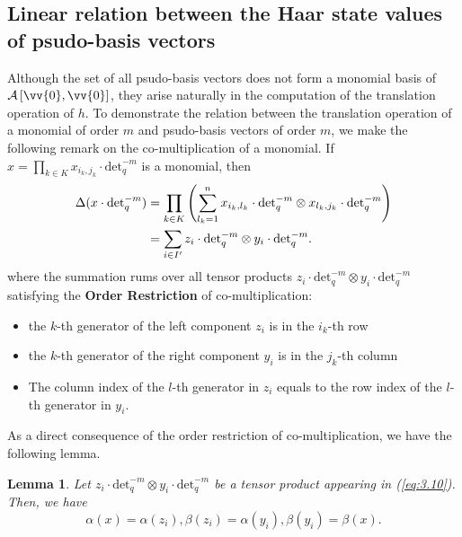 \documentclass[table,a4paper,reqno]{amsart}
\numberwithin{equation}{section}
\newtheorem{lemma}[theorem]{Lemma}
\theoremstyle{definition}
\begin{document}
\subsection{Linear relation between the Haar state values of psudo-basis vectors}
Although the set of all psudo-basis vectors does not form a monomial basis of $\mathcal{A}\left[\vv{0},\vv{0}\right]$, they arise naturally in the computation of the translation operation of $h$. To demonstrate the relation between the translation operation of a monomial of order $m$ and psudo-basis vectors of order $m$, we make the following remark on the co-multiplication of a monomial. If $x=\prod_{k\in K}x_{i_k,j_k}\cdot\text{det}_q^{-m}$ is a monomial, then
\begin{align}\label{eq:3.10}
    \Delta(x\cdot\text{det}_q^{-m})&=\prod_{k\in K}\left(\sum_{l_k=1}^nx_{i_k,l_k}\cdot\text{det}_q^{-m}\otimes x_{l_k,j_k}\cdot\text{det}_q^{-m}\right)\\
    &=\sum_{i\in I'} z_i\cdot\text{det}_q^{-m}\otimes y_i\cdot\text{det}_q^{-m}.\notag
\end{align}
where the summation rums over all tensor products  $z_i\cdot\text{det}_q^{-m}\otimes y_i\cdot\text{det}_q^{-m}$ satisfying the \textbf{Order Restriction} of co-multiplication:
\begin{itemize}
    \item[i)] the $k$-th generator of the left component $z_i$ is in the $i_k$-th row
    \item[ii)] the $k$-th generator of the right component $y_i$ is in the $j_k$-th column
    \item[iii)] The column index of the $l$-th generator in $z_i$ equals to the row index of the $l$-th generator in $y_i$.
\end{itemize}
As a direct consequence of the order restriction of co-multiplication, we have the following lemma.
\begin{lemma}\label{lemma:3.6}
    Let $z_i\cdot\text{det}_q^{-m}\otimes y_i\cdot\text{det}_q^{-m}$ be a tensor product appearing in (\ref{eq:3.10}). Then, we have
    \begin{equation}\label{eq:3.11}
        \alpha(x)=\alpha(z_i), \beta(z_i)=\alpha(y_i), \beta(y_i)=\beta(x).
    \end{equation}
\end{lemma}
\end{document}
